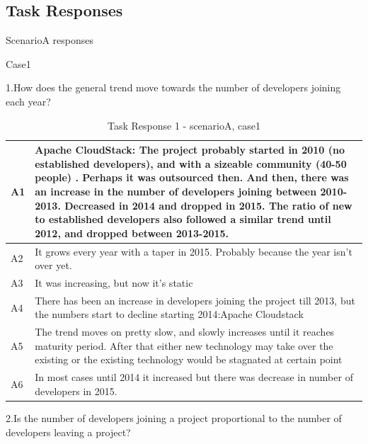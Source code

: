 \documentclass[seploa]{beavtex}
\begin{document}
\begin{appendices}
\chapter{Task Responses}

ScenarioA responses

Case1

1.How does the general trend move towards the number of developers joining each year?

\begin{table}[H]
\begin{tabular}{ |p{2cm}|p{12cm}| }
 \hline
 A1 & Apache CloudStack: The project probably started in 2010 (no established developers), and with a sizeable community (40-50 people) . Perhaps it was outsourced then. And then, there was an increase in the number of developers joining between 2010-2013. Decreased in 2014 and dropped in 2015. The ratio of new to established developers also followed a similar trend until 2012, and dropped between 2013-2015.\\
 \hline
 A2 & It grows every year with a taper in 2015. Probably because the year isn't over yet.\\ \hline
 A3 & It was increasing, but now it's static\\ \hline
 A4 & There has been an increase in developers joining the project till 2013, but the numbers start to decline starting 2014:Apache Cloudstack\\ \hline
 A5 & The trend moves on pretty slow, and slowly increases until it reaches maturity period. After that either new technology may take over the existing or the existing technology would be stagnated at certain point\\ \hline
 A6 & In most cases until 2014 it increased but there was decrease in number of developers in 2015.\\
 \hline
\end{tabular}
\caption{Task Response 1 - scenarioA, case1}
\label{tab:table1}
\end{table}

2.Is the number of developers joining a project proportional to the number of developers leaving a project?


\end{appendices}
\end{document}
